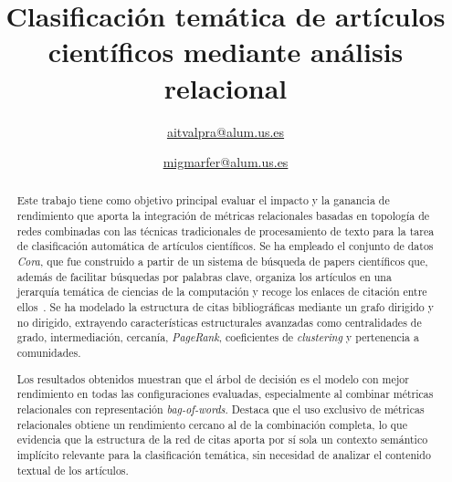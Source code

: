 \documentclass[conference,a4paper]{IEEEtran}
\begin{document}
\title{Clasificación temática de artículos científicos mediante análisis relacional}

\author{
    \href{mailto:aitvalpra@alum.us.es}{aitvalpra@alum.us.es}
  
  \and
  
    \href{mailto:migmarfer@alum.us.es}{migmarfer@alum.us.es}
}

\maketitle



\begin{abstract}
  Este trabajo tiene como objetivo principal evaluar el impacto y la ganancia de rendimiento que aporta la integración de métricas relacionales basadas en topología de 
  redes combinadas con las técnicas tradicionales de procesamiento de texto para la tarea de clasificación automática de artículos científicos. Se ha empleado el 
  conjunto de datos \emph{Cora}, que fue construido a partir de un sistema de búsqueda de papers científicos que, además de facilitar búsquedas por palabras clave, 
  organiza los artículos en una jerarquía temática de ciencias de la computación y recoge los enlaces de citación entre ellos~\cite{mccallum2024}. 
  Se ha modelado la estructura de citas bibliográficas mediante un grafo dirigido y no dirigido, extrayendo características estructurales avanzadas como 
  centralidades de grado, intermediación, cercanía, \emph{PageRank}, coeficientes de \emph{clustering} y pertenencia a comunidades. 
  
  Los resultados obtenidos muestran que el árbol de decisión es el modelo 
  con mejor rendimiento en todas las configuraciones evaluadas, especialmente al combinar métricas relacionales con representación 
  \emph{bag-of-words}. Destaca que el uso exclusivo de métricas relacionales obtiene un rendimiento cercano al de la combinación completa, 
  lo que evidencia que la estructura de la red de citas aporta por sí sola 
  un contexto semántico implícito relevante para la clasificación temática, 
  sin necesidad de analizar el contenido textual de los artículos.
\end{abstract}
\end{document}
